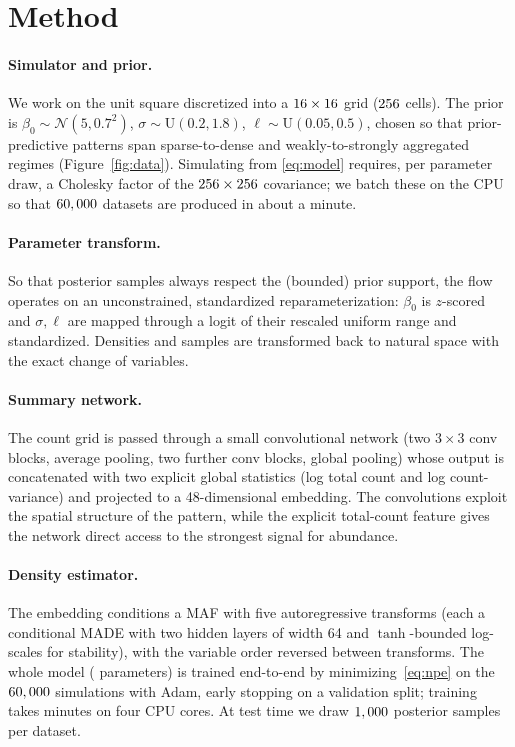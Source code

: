 \documentclass[11pt]{article}
\newcommand{\N}{\mathcal{N}}
\begin{document}
\section{Method}
\label{sec:method}

\paragraph{Simulator and prior.}
We work on the unit square discretized into a $16\times16$ grid
($256$ cells). The prior is
$\beta_0\sim\N(5,0.7^2)$, $\sigma\sim\mathrm{U}(0.2,1.8)$,
$\ell\sim\mathrm{U}(0.05,0.5)$, chosen so that prior-predictive patterns span
sparse-to-dense and weakly-to-strongly aggregated regimes
(Figure~\ref{fig:data}). Simulating from \eqref{eq:model} requires, per parameter
draw, a Cholesky factor of the $256\times256$ covariance; we batch these
on the CPU so that $60,000$ datasets are produced in about a minute.

\paragraph{Parameter transform.}
So that posterior samples always respect the (bounded) prior support, the flow
operates on an unconstrained, standardized reparameterization: $\beta_0$ is
$z$-scored and $\sigma,\ell$ are mapped through a logit of their rescaled uniform
range and standardized. Densities and samples are transformed back to natural
space with the exact change of variables.

\paragraph{Summary network.}
The count grid is passed through a small convolutional network
(two $3\times3$ conv blocks, average pooling, two further conv blocks, global
pooling) whose output is concatenated with two explicit global statistics
(log total count and log count-variance) and projected to a 48-dimensional
embedding. The convolutions exploit the spatial structure of the pattern, while
the explicit total-count feature gives the network direct access to the strongest
signal for abundance.

\paragraph{Density estimator.}
The embedding conditions a MAF with five autoregressive transforms (each a
conditional MADE with two hidden layers of width 64 and $\tanh$-bounded
log-scales for stability), with the variable order reversed between transforms.
The whole model (\NpeParams{} parameters) is trained end-to-end by
minimizing~\eqref{eq:npe} on the $60,000$ simulations with Adam, early stopping
on a validation split; training takes \TrainMin{} minutes on four CPU cores.
At test time we draw $1,000$ posterior samples per dataset.
\end{document}
